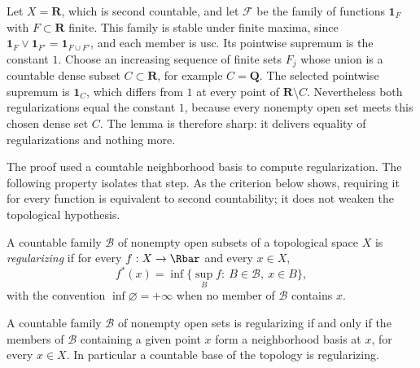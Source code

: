 \begin{example}
\label{ex:choquet-pointwise-fails}
Let $X=\mathbf R$, which is second countable, and let $\mathcal F$ be the
family of functions $\mathbf 1_F$ with $F\subset\mathbf R$ finite.  This family
is stable under finite maxima, since
$\mathbf 1_F\vee\mathbf 1_{F'}=\mathbf 1_{F\cup F'}$, and each member is usc.
Its pointwise supremum is the constant $1$.  Choose an increasing sequence
of finite sets $F_j$ whose union is a countable dense subset
$C\subset\mathbf R$, for example $C=\mathbf Q$.  The selected pointwise
supremum is $\mathbf 1_C$, which differs from $1$ at every point of
$\mathbf R\setminus C$.  Nevertheless both regularizations equal the
constant $1$, because every nonempty open set meets this chosen dense set
$C$.  The lemma is therefore sharp: it delivers equality of
regularizations and nothing more.
\end{example}

The proof used a countable neighborhood basis to compute regularization.
The following property isolates that step.  As the criterion below shows,
requiring it for every function is equivalent to second countability; it
does not weaken the topological hypothesis.

\begin{definition}
\label{def:countably-regularizing}
A countable family $\mathcal B$ of nonempty open subsets of a topological
space $X$ is \emph{regularizing} if for every $f:X\to\Rbar$ and every $x\in X$,
\begin{equation}
\label{eq:countably-regularizing}
 f^*(x)=\inf\bigl\{\textstyle\sup_Bf:\ B\in\mathcal B,\ x\in B\bigr\},
\end{equation}
with the convention $\inf\varnothing=+\infty$ when no member of $\mathcal B$
contains $x$.
\end{definition}

\begin{lemma}\label{lem:regularizing-criterion}
A countable family $\mathcal B$ of nonempty open sets is regularizing if and
only if the members of $\mathcal B$ containing a given point $x$ form a
neighborhood basis at $x$, for every $x\in X$.  In particular a countable base
of the topology is regularizing.
\end{lemma}

